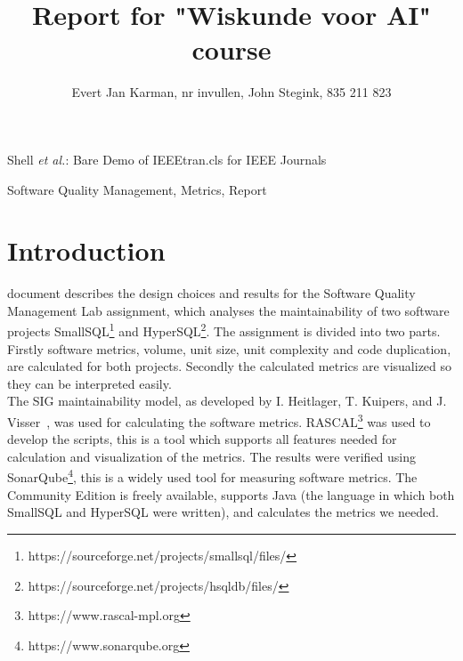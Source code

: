 \documentclass[journal]{IEEEtran}
\begin{document}
\title{Report for "Wiskunde voor AI" course}

\author{
Evert Jan Karman, nr invullen, %
John Stegink,  835 211 823
}%
        
{Shell \MakeLowercase{\textit{et al.}}: Bare Demo of IEEEtran.cls for IEEE Journals}

\maketitle

\begin{abstract}
\end{abstract}

\begin{IEEEkeywords}
Software Quality Management, Metrics, Report
\end{IEEEkeywords}

\section{Introduction}

 document describes the design choices and results for the Software Quality Management Lab assignment, which analyses the maintainability of two software projects SmallSQL\footnote{https://sourceforge.net/projects/smallsql/files/} and HyperSQL\footnote{https://sourceforge.net/projects/hsqldb/files/}. The assignment is divided into two parts. Firstly software metrics, volume, unit size, unit complexity and code duplication, are calculated for both projects. Secondly the calculated metrics are visualized so they can be interpreted easily.\\

The SIG maintainability model, as developed by I. Heitlager, T. Kuipers, and J. Visser~\cite{SIG}, was used for calculating the software metrics. RASCAL\footnote{https://www.rascal-mpl.org} was used to develop the scripts, this is a tool which supports all features needed for calculation and visualization of the metrics. The results were verified using SonarQube\footnote{https://www.sonarqube.org}, this is a widely used tool for measuring software metrics. The Community Edition is freely available, supports Java (the language in which both SmallSQL and HyperSQL were written), and calculates the metrics we needed. \\
\end{document}
